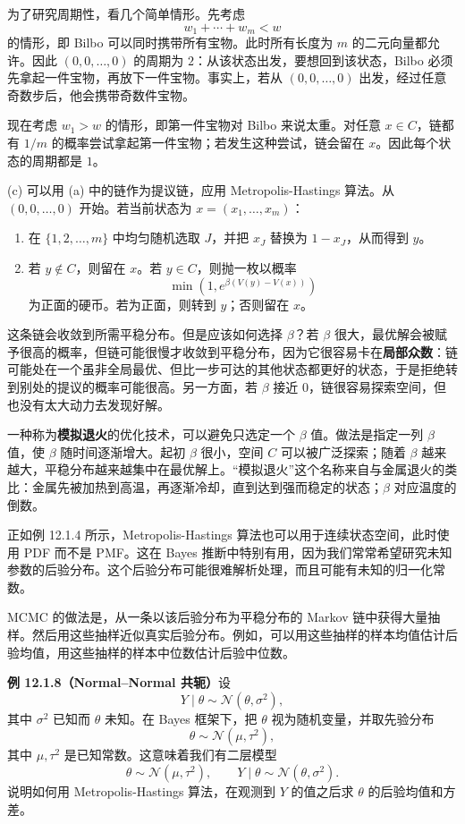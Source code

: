 \documentclass[UTF8,12pt,a4paper,fontset=fandol]{ctexart}
\begin{document}
为了研究周期性，看几个简单情形。先考虑
\[
  w_1+\cdots+w_m<w
\]
的情形，即 Bilbo 可以同时携带所有宝物。此时所有长度为 $m$ 的二元向量都允许。因此 $(0,0,\ldots,0)$ 的周期为 $2$：从该状态出发，要想回到该状态，Bilbo 必须先拿起一件宝物，再放下一件宝物。事实上，若从 $(0,0,\ldots,0)$ 出发，经过任意奇数步后，他会携带奇数件宝物。

现在考虑 $w_1>w$ 的情形，即第一件宝物对 Bilbo 来说太重。对任意 $x\in C$，链都有 $1/m$ 的概率尝试拿起第一件宝物；若发生这种尝试，链会留在 $x$。因此每个状态的周期都是 $1$。

(c) 可以用 (a) 中的链作为提议链，应用 Metropolis-Hastings 算法。从 $(0,0,\ldots,0)$ 开始。若当前状态为 $x=(x_1,\ldots,x_m)$：
\begin{enumerate}
  \item 在 $\{1,2,\ldots,m\}$ 中均匀随机选取 $J$，并把 $x_J$ 替换为 $1-x_J$，从而得到 $y$。
  \item 若 $y\notin C$，则留在 $x$。若 $y\in C$，则抛一枚以概率
  \[
    \min\left(1,e^{\beta(V(y)-V(x))}\right)
  \]
  为正面的硬币。若为正面，则转到 $y$；否则留在 $x$。
\end{enumerate}

这条链会收敛到所需平稳分布。但是应该如何选择 $\beta$？若 $\beta$ 很大，最优解会被赋予很高的概率，但链可能很慢才收敛到平稳分布，因为它很容易卡在\textbf{局部众数}：链可能处在一个虽非全局最优、但比一步可达的其他状态都更好的状态，于是拒绝转到别处的提议的概率可能很高。另一方面，若 $\beta$ 接近 $0$，链很容易探索空间，但也没有太大动力去发现好解。

一种称为\textbf{模拟退火}的优化技术，可以避免只选定一个 $\beta$ 值。做法是指定一列 $\beta$ 值，使 $\beta$ 随时间逐渐增大。起初 $\beta$ 很小，空间 $C$ 可以被广泛探索；随着 $\beta$ 越来越大，平稳分布越来越集中在最优解上。“模拟退火”这个名称来自与金属退火的类比：金属先被加热到高温，再逐渐冷却，直到达到强而稳定的状态；$\beta$ 对应温度的倒数。

正如例 12.1.4 所示，Metropolis-Hastings 算法也可以用于连续状态空间，此时使用 PDF 而不是 PMF。这在 Bayes 推断中特别有用，因为我们常常希望研究未知参数的后验分布。这个后验分布可能很难解析处理，而且可能有未知的归一化常数。

MCMC 的做法是，从一条以该后验分布为平稳分布的 Markov 链中获得大量抽样。然后用这些抽样近似真实后验分布。例如，可以用这些抽样的样本均值估计后验均值，用这些抽样的样本中位数估计后验中位数。

\noindent\textbf{例 12.1.8（Normal--Normal 共轭）}\quad 设
\[
  Y\mid\theta\sim\mathcal N(\theta,\sigma^2),
\]
其中 $\sigma^2$ 已知而 $\theta$ 未知。在 Bayes 框架下，把 $\theta$ 视为随机变量，并取先验分布
\[
  \theta\sim\mathcal N(\mu,\tau^2),
\]
其中 $\mu,\tau^2$ 是已知常数。这意味着我们有二层模型
\[
  \theta\sim\mathcal N(\mu,\tau^2),
  \qquad
  Y\mid\theta\sim\mathcal N(\theta,\sigma^2).
\]
说明如何用 Metropolis-Hastings 算法，在观测到 $Y$ 的值之后求 $\theta$ 的后验均值和方差。
\end{document}
